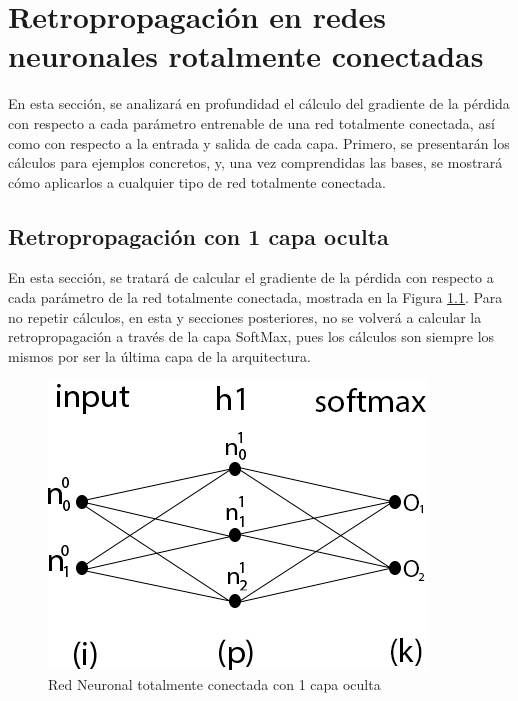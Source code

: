 
\chapter{Retropropagación en redes neuronales rotalmente conectadas} \label{backprop_fully_apendice}

En esta sección, se analizará en profundidad el cálculo del gradiente de la pérdida con respecto a cada parámetro entrenable de una red totalmente conectada, así como con respecto a la entrada y salida de cada capa. Primero, se presentarán los cálculos para ejemplos concretos, y, una vez comprendidas las bases, se mostrará cómo aplicarlos a cualquier tipo de red totalmente conectada.

\section{Retropropagación con 1 capa oculta \cite{NN_backpropagation} \cite{NN_backprop_2} \label{backprop_1_capa}}

En esta sección, se tratará de calcular el gradiente de la pérdida con respecto a cada parámetro de la red totalmente conectada, mostrada en la Figura \ref{fig:nn_1_capa}. Para no repetir cálculos, en esta y secciones posteriores, no se volverá a calcular la retropropagación a través de la capa SoftMax, pues los cálculos son siempre los mismos por ser la última capa de la arquitectura.

\begin{figure}[H]
	\centering
	\includegraphics[scale=0.35]{imagenes/nn_1_capa.jpg}  
	\caption{Red Neuronal totalmente conectada con 1 capa oculta}
	\label{fig:nn_1_capa}
\end{figure}

